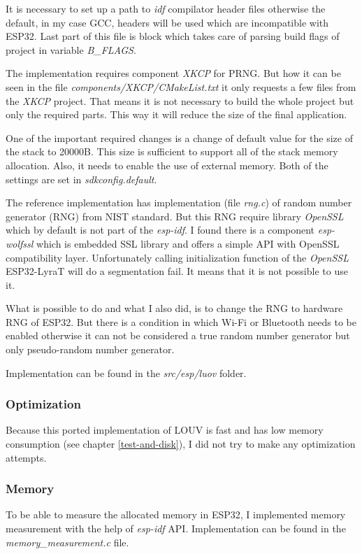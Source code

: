 \documentclass[thesis=M,english]{FITthesis}[2019/12/23]
\begin{document}
\noindent
It is necessary to set up a path to \textit{idf} compilator header files otherwise the default, in my case GCC, headers will be used which are incompatible with ESP32.
Last part of this file is block which takes care of parsing build flags of project in variable \textit{B\_FLAGS}.

\bigskip
\noindent
The implementation requires component \textit{XKCP} for PRNG. But how it can be seen in the file \textit{components/XKCP/CMakeList.txt} it only requests a few files from the \textit{XKCP} project. That means it is not necessary to build the whole project but only the required parts. This way it will reduce the size of the final application.

\bigskip
\noindent
One of the important required changes is a change of default value for the size of the stack to 20000B. This size is sufficient to support all of the stack memory allocation. Also, it needs to enable the use of external memory. Both of the settings are set in \textit{sdkconfig.default}.

\bigskip
\noindent
The reference implementation has implementation (file \textit{rng.c}) of random number generator (RNG) from NIST standard. But this RNG require library \textit{OpenSSL} which by default is not part of the \textit{esp-idf}. I found there is a component \textit{esp-wolfssl} which is embedded SSL library and offers a simple API with OpenSSL compatibility layer. Unfortunately calling initialization function of the \textit{OpenSSL} ESP32-LyraT will do a segmentation fail. It means that it is not possible to use it.

\bigskip
\noindent
What is possible to do and what I also did, is to change the RNG to hardware RNG of ESP32. But there is a condition in which Wi-Fi or Bluetooth needs to be enabled otherwise it can not be considered a true random number generator but only pseudo-random number generator.

\bigskip
\noindent
Implementation can be found in the \textit{src/esp/luov} folder.

\subsubsection{Optimization}
Because this ported implementation of LOUV is fast and has low memory consumption (see chapter \ref{test-and-disk}), I did not try to make any optimization attempts.

\subsubsection{Memory} \label{esp-luov-memory}
To be able to measure the allocated memory in ESP32, I implemented memory measurement with the help of \textit{esp-idf} API. Implementation can be found in the \textit{memory\_measurement.c} file.
\end{document}
